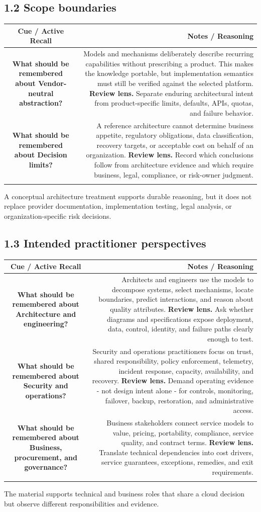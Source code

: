 \documentclass[11pt]{article}
\newcommand{\CornellHeader}{\rowcolor{Navy}\color{white}\bfseries Cue / Active Recall & \color{white}\bfseries Notes / Reasoning \\\endhead}
\newcommand{\CornellRow}[2]{\cellcolor{CueGray}\textbf{#1} & #2 \\\addlinespace[3pt]}
\begin{document}
\subsection{1.2 Scope boundaries}
\begin{longtable}{@{}C N@{}}
\CornellHeader
\CornellRow{What should be remembered about Vendor-neutral abstraction?}{Models and mechanisms deliberately describe recurring capabilities without prescribing a product. This makes the knowledge portable, but implementation semantics must still be verified against the selected platform. \textbf{Review lens.} Separate enduring architectural intent from product-specific limits, defaults, APIs, quotas, and failure behavior.}
\CornellRow{What should be remembered about Decision limits?}{A reference architecture cannot determine business appetite, regulatory obligations, data classification, recovery targets, or acceptable cost on behalf of an organization. \textbf{Review lens.} Record which conclusions follow from architecture evidence and which require business, legal, compliance, or risk-owner judgment.}
\end{longtable}
\begin{sectionsummarybox}
A conceptual architecture treatment supports durable reasoning, but it does not replace provider documentation, implementation testing, legal analysis, or organization-specific risk decisions.
\end{sectionsummarybox}
\subsection{1.3 Intended practitioner perspectives}
\begin{longtable}{@{}C N@{}}
\CornellHeader
\CornellRow{What should be remembered about Architecture and engineering?}{Architects and engineers use the models to decompose systems, select mechanisms, locate boundaries, predict interactions, and reason about quality attributes. \textbf{Review lens.} Ask whether diagrams and specifications expose deployment, data, control, identity, and failure paths clearly enough to test.}
\CornellRow{What should be remembered about Security and operations?}{Security and operations practitioners focus on trust, shared responsibility, policy enforcement, telemetry, incident response, capacity, availability, and recovery. \textbf{Review lens.} Demand operating evidence - not design intent alone - for controls, monitoring, failover, backup, restoration, and administrative access.}
\CornellRow{What should be remembered about Business, procurement, and governance?}{Business stakeholders connect service models to value, pricing, portability, compliance, service quality, and contract terms. \textbf{Review lens.} Translate technical dependencies into cost drivers, service guarantees, exceptions, remedies, and exit requirements.}
\end{longtable}
\begin{sectionsummarybox}
The material supports technical and business roles that share a cloud decision but observe different responsibilities and evidence.
\end{sectionsummarybox}
\end{document}
